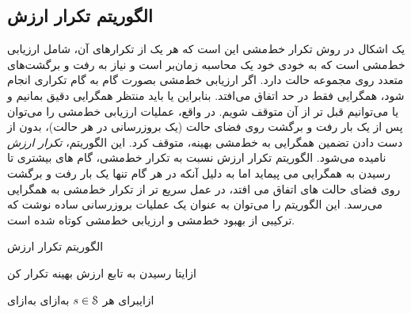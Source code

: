 \subsection{الگوریتم تکرار ارزش}
یک اشکال در روش تکرار خط‌مشی این است که هر یک از تکرارهای آن، شامل ارزیابی خط‌مشی است که
به خودی خود یک محاسبه زمان‌بر است و نیاز به رفت و برگشت‌های متعدد روی مجموعه حالت دارد. اگر
ارزیابی خط‌مشی بصورت گام به گام تکراری انجام شود، همگرایی فقط در حد اتفاق می‌افتد. بنابراین یا باید منتظر همگرایی دقیق بمانیم و یا می‌توانیم قبل تر از آن متوقف شویم. 
در واقع، عملیات ارزیابی خط‌مشی را می‌توان پس از یک بار رفت و برگشت روی فضای حالت (یک بروزرسانی در هر حالت)،  بدون از دست دادن تضمین همگرایی به خط‌مشی بهینه، متوقف کرد. 
این الگوریتم،
\textit{تکرار ارزش}
 نامیده می‌شود. الگوریتم تکرار ارزش نسبت به تکرار خط‌مشی، گام های بیشتری تا رسیدن به همگرایی می پیماید اما به دلیل آنکه در هر گام تنها یک بار رفت و برگشت روی فضای حالت های اتفاق می افتد، در عمل سریع تر از تکرار خط‌مشی به همگرایی می‌رسد. این الگوریتم
را می‌توان به عنوان یک عملیات بروزرسانی ساده نوشت که ترکیبی از بهبود خط‌مشی و ارزیابی خط‌مشی کوتاه شده است.



{الگوریتم تکرار ارزش}

‌ازای{تا رسیدن به تابع ارزش بهینه تکرار کن}

‌ازای{برای هر $s \in \EuScript{S}$}
‌به‌ازای
‌به‌ازای


